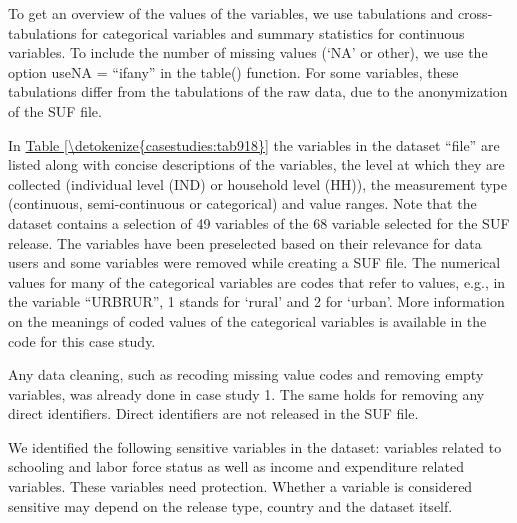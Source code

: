 \documentclass[letterpaper,10pt,english]{sphinxmanual}
\begin{document}
To get an overview of the values of the variables, we use tabulations
and cross-tabulations for categorical variables and summary statistics
for continuous variables. To include the number of missing values (‘NA’
or other), we use the option useNA = “ifany” in the table() function.
For some variables, these tabulations differ from the tabulations of the
raw data, due to the anonymization of the SUF file.

In \hyperref[\detokenize{casestudies:tab918}]{Table \ref{\detokenize{casestudies:tab918}}} the variables in the dataset “file” are listed along with
concise descriptions of the variables, the level at which they are
collected (individual level (IND) or household level (HH)), the
measurement type (continuous, semi-continuous or categorical) and value
ranges. Note that the dataset contains a selection of 49 variables of
the 68 variable selected for the SUF release. The variables have been
preselected based on their relevance for data users and some variables
were removed while creating a SUF file. The numerical values for many of
the categorical variables are codes that refer to values, e.g., in the
variable “URBRUR”, 1 stands for ‘rural’ and 2 for ‘urban’. More
information on the meanings of coded values of the categorical variables
is available in the  code for this case study.

Any data cleaning, such as recoding missing value codes and removing
empty variables, was already done in case study 1. The same holds for
removing any direct identifiers. Direct identifiers are not released in
the SUF file.

We identified the following sensitive variables in the dataset:
variables related to schooling and labor force status as well as income
and expenditure related variables. These variables need protection.
Whether a variable is considered sensitive may depend on the release
type, country and the dataset itself.
\end{document}
